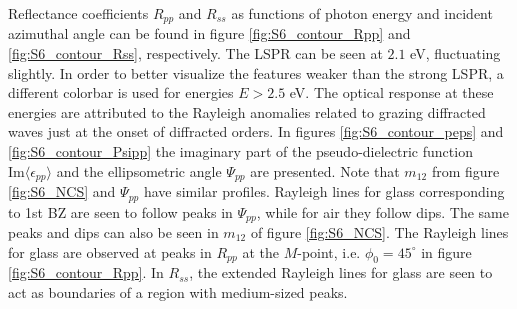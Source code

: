 Reflectance coefficients $R_{pp}$ and $R_{ss}$ as functions of photon energy and incident azimuthal angle can be found in figure \ref{fig:S6_contour_Rpp} and \ref{fig:S6_contour_Rss}, respectively. The LSPR can be seen at $2.1$ eV, fluctuating slightly. In order to better visualize the features weaker than the strong LSPR, a different colorbar is used for energies $E>2.5$ eV. The optical response at these energies are attributed to the Rayleigh anomalies related to grazing diffracted waves just at the onset of diffracted orders\cite{Brakstad:15}. In figures \ref{fig:S6_contour_peps} and \ref{fig:S6_contour_Psipp} the imaginary part of the pseudo-dielectric function $\text{Im}\langle\epsilon_{pp}\rangle$ and the ellipsometric angle $\Psi_{pp}$ are presented. Note that $m_{12}$ from figure \ref{fig:S6_NCS} and $\Psi_{pp}$ have similar profiles. Rayleigh lines for glass corresponding to 1st BZ are seen to follow peaks in $\Psi_{pp}$, while for air they follow dips. The same peaks and dips can also be seen in $m_{12}$ of figure \ref{fig:S6_NCS}. The Rayleigh lines for glass are observed at peaks in $R_{pp}$ at the $M$-point, i.e. $\phi_0=45^\circ$ in figure \ref{fig:S6_contour_Rpp}. In $R_{ss}$, the extended Rayleigh lines for glass are seen to act as boundaries of a region with medium-sized peaks.

